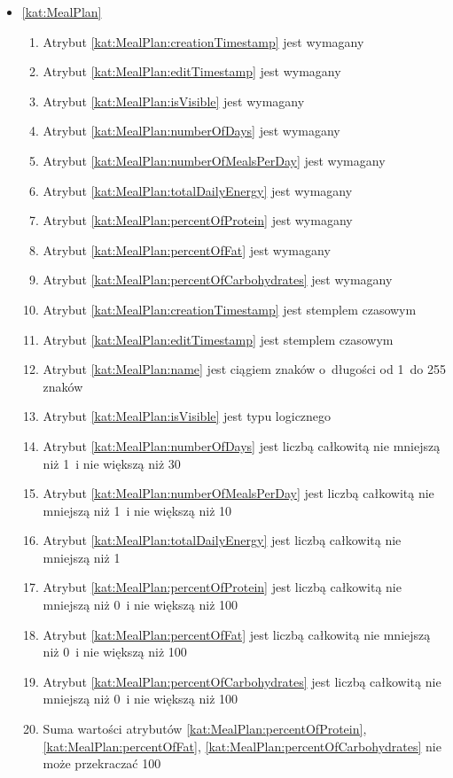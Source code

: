 \begin{itemize}[label={\textbf{Ograniczenia dla}}, wide, labelwidth=!, labelindent=0pt]
    \setlength\itemsep{1.75em}
    \item\ref{kat:MealPlan}\mynobreakpar
    \begin{enumerate}[label={\textbf{OGR/3/\protect\twodigits{\arabic{enumi}}}}, wide, labelwidth=!, align=left, leftmargin=3cm]
        \item Atrybut \ref{kat:MealPlan:creationTimestamp} jest wymagany
        \item Atrybut \ref{kat:MealPlan:editTimestamp} jest wymagany
        \item Atrybut \ref{kat:MealPlan:isVisible} jest wymagany
        \item Atrybut \ref{kat:MealPlan:numberOfDays}  jest wymagany
        \item Atrybut \ref{kat:MealPlan:numberOfMealsPerDay} jest wymagany
        \item Atrybut \ref{kat:MealPlan:totalDailyEnergy} jest wymagany
        \item Atrybut \ref{kat:MealPlan:percentOfProtein} jest wymagany
        \item Atrybut \ref{kat:MealPlan:percentOfFat} jest wymagany
        \item Atrybut \ref{kat:MealPlan:percentOfCarbohydrates} jest wymagany

        \item Atrybut \ref{kat:MealPlan:creationTimestamp} jest stemplem czasowym
        \item Atrybut \ref{kat:MealPlan:editTimestamp} jest stemplem czasowym
        \item Atrybut \ref{kat:MealPlan:name} jest ciągiem znaków o~długości od 1~do 255 znaków
        \item Atrybut \ref{kat:MealPlan:isVisible} jest typu logicznego
        \item Atrybut \ref{kat:MealPlan:numberOfDays} jest liczbą całkowitą nie mniejszą niż 1~i nie większą niż 30
        \item Atrybut \ref{kat:MealPlan:numberOfMealsPerDay} jest liczbą całkowitą nie mniejszą niż 1~i nie większą niż 10
        \item Atrybut \ref{kat:MealPlan:totalDailyEnergy} jest liczbą całkowitą nie mniejszą niż 1
        \item Atrybut \ref{kat:MealPlan:percentOfProtein} jest liczbą całkowitą nie mniejszą niż 0~i nie większą niż 100
        \item Atrybut \ref{kat:MealPlan:percentOfFat} jest liczbą całkowitą nie mniejszą niż 0~i nie większą niż 100
        \item Atrybut \ref{kat:MealPlan:percentOfCarbohydrates} jest liczbą całkowitą nie mniejszą niż 0~i nie większą niż 100
        \item Suma wartości atrybutów \ref{kat:MealPlan:percentOfProtein}, \ref{kat:MealPlan:percentOfFat}, \ref{kat:MealPlan:percentOfCarbohydrates} nie może przekraczać 100
    \end{enumerate}


\end{itemize}
